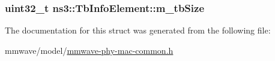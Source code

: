 \subsubsection[{\texorpdfstring{m\+\_\+tb\+Size}{m_tbSize}}]{\setlength{\rightskip}{0pt plus 5cm}uint32\+\_\+t ns3\+::\+Tb\+Info\+Element\+::m\+\_\+tb\+Size}\hypertarget{structns3_1_1TbInfoElement_a4749ae09553dba816f6fc35ff766484a}{}\label{structns3_1_1TbInfoElement_a4749ae09553dba816f6fc35ff766484a}


The documentation for this struct was generated from the following file\+:\begin{DoxyCompactItemize}
\item 
mmwave/model/\hyperlink{mmwave-phy-mac-common_8h}{mmwave-\/phy-\/mac-\/common.\+h}\end{DoxyCompactItemize}
